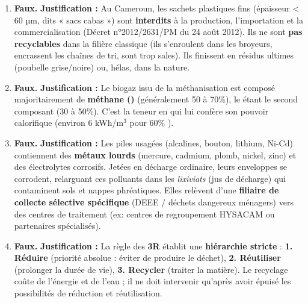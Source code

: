 \documentclass[11pt]{article}
\begin{document}
\begin{corrige}
\begin{enumerate}
    \item \textbf{Faux.}
    \textbf{Justification :} Au Cameroun, les sachets plastiques fins (épaisseur < 60 µm, dits « sacs cabas ») sont \textbf{interdits} à la production, l'importation et la commercialisation (Décret n°2012/2631/PM du 24 août 2012). Ils ne sont \textbf{pas recyclables} dans la filière classique (ils s'enroulent dans les broyeurs, encrassent les chaînes de tri, sont trop sales). Ils finissent en résidus ultimes (poubelle grise/noire) ou, hélas, dans la nature.

    \item \textbf{Faux.}
    \textbf{Justification :} Le biogaz issu de la méthanisation est composé majoritairement de \textbf{méthane ()} (généralement 50 à 70\%), le  étant le second composant (30 à 50\%). C'est la teneur en  qui lui confère son pouvoir calorifique (environ 6 kWh/m$^3$ pour 60\% ).

    \item \textbf{Faux.}
    \textbf{Justification :} Les piles usagées (alcalines, bouton, lithium, Ni-Cd) contiennent des \textbf{métaux lourds} (mercure, cadmium, plomb, nickel, zinc) et des électrolytes corrosifs. Jetées en décharge ordinaire, leurs enveloppes se corrodent, relarguant ces polluants dans les \emph{lixiviats} (jus de décharge) qui contaminent sols et nappes phréatiques. Elles relèvent d'une \textbf{filiaire de collecte sélective spécifique} (DEEE / déchets dangereux ménagers) vers des centres de traitement (ex: centres de regroupement HYSACAM ou partenaires spécialisés).

    \item \textbf{Faux.}
    \textbf{Justification :} La règle des \textbf{3R} établit une \textbf{hiérarchie stricte} : 
    \textbf{1. Réduire} (priorité absolue : éviter de produire le déchet), 
    \textbf{2. Réutiliser} (prolonger la durée de vie), 
    \textbf{3. Recycler} (traiter la matière). 
    Le recyclage coûte de l'énergie et de l'eau ; il ne doit intervenir qu'après avoir épuisé les possibilités de réduction et réutilisation.
\end{enumerate}
\end{corrige}
\end{document}
